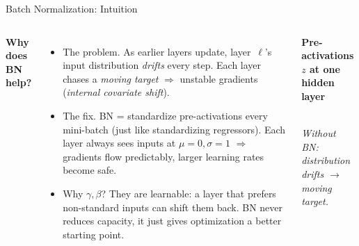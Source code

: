 \documentclass[aspectratio=169,11pt]{beamer}
\newcommand{\emphc}[1]{\textcolor{harvardcrimson}{#1}}
\begin{document}
\begin{frame}{Batch Normalization: Intuition}
\begin{columns}[T]
\textbf{Why does BN help?}
\begin{itemize}\itemsep3pt
    \item[\textcolor{harvardcrimson}{$\blacktriangleright$}] {\small \emphc{The problem.} As earlier layers update, layer~$\ell$'s input distribution \emph{drifts} every step. Each layer chases a \textit{moving target} $\Rightarrow$ unstable gradients (\textit{internal covariate shift}).}
    \item[\textcolor{harvardcrimson}{$\blacktriangleright$}] {\small \emphc{The fix.} BN = standardize pre-activations every mini-batch (just like standardizing regressors). Each layer always sees inputs at $\mu{=}0,\sigma{=}1$ $\Rightarrow$ gradients flow predictably, larger learning rates become safe.}
    \item[\textcolor{harvardcrimson}{$\blacktriangleright$}] {\small \emphc{Why $\gamma,\beta$?} They are learnable: a layer that prefers non-standard inputs can shift them back. BN never reduces capacity, it just gives optimization a better starting point.}
\end{itemize}

\begin{center}
{\small\textbf{Pre-activations $z$ at one hidden layer}}\\[0.16cm]

\\[-0.1cm]
{\scriptsize\itshape Without BN: distribution drifts $\to$ moving target.}


\end{center}
\end{columns}
\end{frame}
\end{document}
